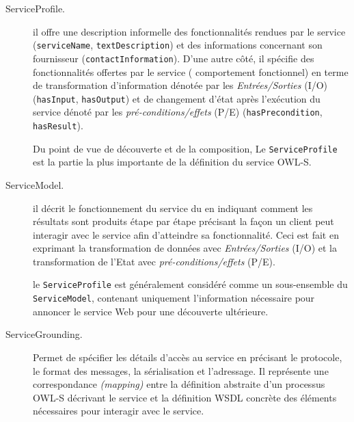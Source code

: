     \SpecialItem
    \renewcommand{\descriptionlabel}[1]{\hspace{1cm}\texttt{#1}}
    \begin{description}
    \item[ServiceProfile.] il offre une description informelle des
      fonctionnalités rendues par le service (\verb|serviceName|,
      \verb|textDescription|) et des informations concernant son
      fournisseur (\verb|contactInformation|). D'une autre côté, il
      spécifie des fonctionnalités offertes par le service (
      comportement fonctionnel) en terme de transformation
      d'information dénotée par les \textit{Entrées/Sorties}
      \textsc{(I/O)} (\verb|hasInput|, \verb|hasOutput|) et de
      changement d'état après l'exécution du service dénoté par les
      \textit{pré-conditions/effets} \textsc{(P/E)}
      (\verb|hasPrecondition|, \verb|hasResult|).

      Du point de vue de découverte et de la composition, Le
      \verb|ServiceProfile| est la partie la plus importante de la
      définition du service \textsc{OWL-S}.

    \item[ServiceModel.] il décrit le fonctionnement du service du en
      indiquant comment les résultats sont produits étape par étape
      précisant la façon un client peut interagir avec le service afin
      d'atteindre sa fonctionnalité. Ceci est fait en exprimant la
      transformation de données avec \textit{Entrées/Sorties}
      \textsc{(I/O)} et la transformation de l'Etat avec
      \textit{pré-conditions/effets} \textsc{(P/E)}.

      le \verb|ServiceProfile| est généralement considéré comme un
      sous-ensemble du \verb|ServiceModel|, contenant uniquement
      l'information nécessaire pour annoncer le service Web pour une
      découverte ultérieure.

    \item[ServiceGrounding.] Permet de spécifier les détails d'accès
      au service en précisant le protocole, le format des messages, la
      sérialisation et l'adressage. Il représente une correspondance
      \textit{(mapping)} entre la définition abstraite d'un processus
      \textsc{OWL-S} décrivant le service et la définition
      \textsc{WSDL} concrète des éléments nécessaires pour interagir
      avec le service.

    \end{description}
    \enddescription

